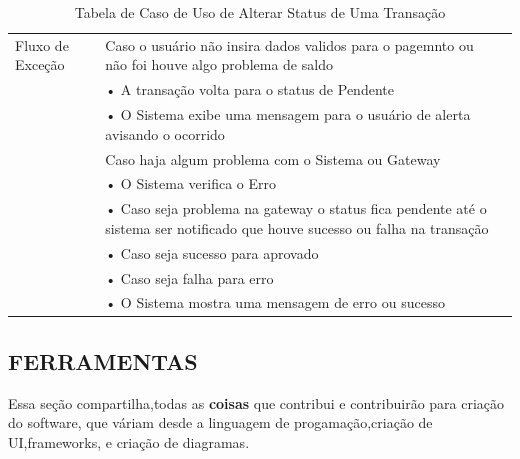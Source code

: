 \documentclass[a4paper,12pt]{article}
\begin{document}
\begin{table}[ht]
\begin{tabular}{|p{3.5cm}|p{10cm}|p{7cm}|}
        \multirow{1}{*}{Fluxo de Exceção}
                                           & Caso o usuário não insira dados validos para o pagemnto ou não foi houve algo problema de saldo                             \\
                                           & • A transação volta para o status  de Pendente                                                                              \\
                                           & • O Sistema exibe uma mensagem para o usuário de alerta avisando o ocorrido                                                 \\
                                           & Caso haja algum problema com o Sistema ou Gateway                                                                           \\
                                           & • O Sistema verifica o Erro                                                                                                 \\
                                           & • Caso seja problema na gateway o status fica pendente até o sistema ser notificado que houve sucesso ou falha na transação \\
                                           & • Caso seja sucesso para aprovado                                                                                           \\
                                           & • Caso seja falha para erro                                                                                                 \\
                                           & • O Sistema mostra uma mensagem de erro ou sucesso                                                                          \\

        \hline
    \end{tabular}
    \caption{Tabela de Caso de Uso de Alterar Status de Uma Transação}
\end{table}

\clearpage
\subsection{FERRAMENTAS}
Essa seção compartilha,todas as \textbf{coisas} que contribui e contribuirão para criação do software, que váriam desde a linguagem de progamação,criação de \ac{UI},frameworks, e criação de diagramas.
\end{document}
